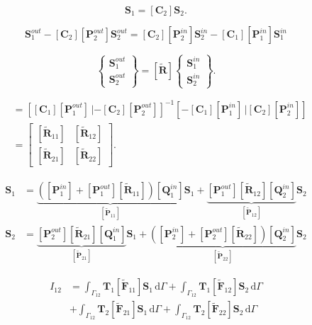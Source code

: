\documentclass[11pt,A4paper]{book}
\newcommand{\ds}{\displaystyle}
\newcommand{\tb}{\textbf}
\newcommand{\wdt}[1]{\widetilde{#1}}
\renewcommand{\d}{\,\textrm{d}}
\renewcommand{\:}{\tb{:}}
\begin{document}
\begin{equation}
	[\tb{C}_1]\tb{S}_1=[\tb{C}_2]\tb{S}_2.
\end{equation}


\begin{equation}
	[\tb{C}_1][\tb{P}^{out}_1]\tb{S}_1^{out} -[\tb{C}_2][\tb{P}^{out}_2]\tb{S}_2^{out}=[\tb{C}_2][\tb{P}^{in}_2]\tb{S}_2^{in}-[\tb{C}_1][\tb{P}^{in}_1]\tb{S}_1^{in}
\end{equation}

\begin{equation}
\left\{
\begin{array}{c}
{\tb{S}_1^{out}}\\
{\tb{S}_2^{out}}
\end{array}
\right\}
=[\wdt{\tb{R}}]
\left\{
\begin{array}{c}
\tb{S}_1^{in}\\
\tb{S}_2^{in}
\end{array}
\right\}.
\end{equation}

\begin{align}
[\wdt{\tb{R}}]&=\left[[\tb{C}_1][\tb{P}^{out}_1] \, | -[\tb{C}_2][\tb{P}^{out}_2]\right]^{-1}\left[-[\tb{C}_1][\tb{P}^{in}_1] \, | [\tb{C}_2][\tb{P}^{in}_2]\right]\\
&=\left[
\begin{array}{cc}
{[\wdt{\tb{R}}_{11}]} & {[\wdt{\tb{R}}_{12}]}\\
{[\wdt{\tb{R}}_{21}]} & {[\wdt{\tb{R}}_{22}]}
\end{array}	
\right].
\end{align}


\begin{align}
	\tb{S}_1&=\underbrace{\left([\tb{P}^{in}_1]+[\tb{P}^{out}_1][\wdt{\tb{R}}_{11}]\right) [\tb{Q}_1^{in}]}_{[\wdt{\tb{P}}_{11}]}\tb{S}_1+\underbrace{[\tb{P}_1^{out}][\wdt{\tb{R}}_{12}] [\tb{Q}_2^{in}]}_{[\wdt{\tb{P}}_{12}]}\tb{S}_2\\
	\tb{S}_2&=\underbrace{[\tb{P}_2^{out}][\wdt{\tb{R}}_{21}] [\tb{Q}_1^{in}]}_{[\wdt{\tb{P}}_{21}]}\tb{S}_1+
	\underbrace{\left([\tb{P}^{in}_2]+[\tb{P}^{out}_2][\wdt{\tb{R}}_{22}]\right) [\tb{Q}_2^{in}]}_{[\wdt{\tb{P}}_{22}]}\tb{S}_2
\end{align}


\begin{align}
I_{12}&=
\ds{\int_{\Gamma_{12}}} 
\tb{T}_1 [\wdt{\tb{F}}_{11}]\tb{S}_1 \d\Gamma +
\ds{\int_{\Gamma_{12}}} 
\tb{T}_1 [\wdt{\tb{F}}_{12}]\tb{S}_2 \d\Gamma\\&+
\ds{\int_{\Gamma_{12}}} 
\tb{T}_2 [\wdt{\tb{F}}_{21}]\tb{S}_1 \d\Gamma +
\ds{\int_{\Gamma_{12}}} 
\tb{T}_2 [\wdt{\tb{F}}_{22}]\tb{S}_2 \d\Gamma
\end{align}
\end{document}

